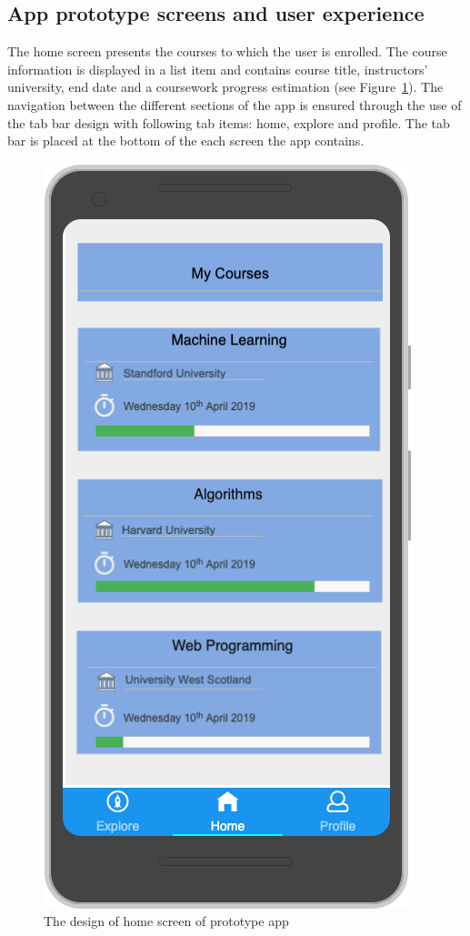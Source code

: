 \documentclass[version=last,fontsize=13pt]{scrartcl}
\begin{document}
	\subsection{App prototype screens and user experience}

	The home screen presents the courses to which the user is enrolled. The course information is displayed in a list item and contains  course title, instructors' university, end date and a coursework progress estimation (see Figure~\ref{hSP}). The navigation between the different sections of the app is ensured through the use of the tab bar design with following tab items: home, explore and profile. The tab bar is placed at the bottom of the each screen the app contains. 
		\begin{figure}[H]

			\centering	
			\includegraphics[scale = 0.4]{./imgs/prototype/homeScreen}
			\caption{The design of home screen of prototype app}
			\label{hSP}

		\end{figure}
\end{document}
